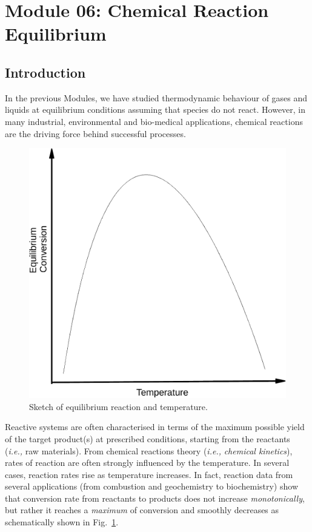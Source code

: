 \documentclass[12pts,a4paper,amsmath,amssymb,floatfix]{article}%
\newcommand{\ie}{{\it i.e., }}
\newcounter{reaction}
\begin{document}
\clearpage

\section{Module 06: Chemical Reaction Equilibrium}\label{Section:06}

\subsection{Introduction}\label{Section:06:Introduction}
In the previous Modules, we have studied thermodynamic behaviour of gases and liquids at equilibrium conditions assuming that species do not react. However, in many industrial, environmental and bio-medical applications, chemical reactions are the driving force behind successful processes. 

      \begin{figure}%
         \begin{center}
           \includegraphics[width=0.5\columnwidth,clip]{./Figs/Mod06_SchematicEqReaction_Temp_b}
           \caption{Sketch of equilibrium reaction and temperature.}\label{Mod06Fig01}
         \end{center}
       \end{figure}%
Reactive systems are often characterised in terms of the maximum possible yield of the target product(s) at prescribed conditions, starting from the reactants (\ie raw materials). From chemical reactions theory (\ie {\it chemical kinetics}), rates of reaction are often strongly influenced by the temperature. In several cases, reaction rates rise as temperature increases. In fact, reaction data from several applications (from combustion and geochemistry to biochemistry) show that conversion rate from reactants to products does not increase {\it monotonically}, but rather it reaches a {\it maximum} of conversion and smoothly decreases as schematically shown in Fig.~\ref{Mod06Fig01}.
\end{document}
